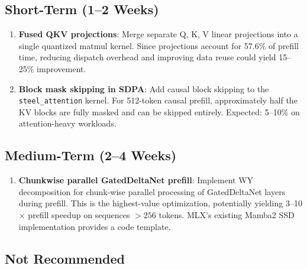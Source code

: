 \documentclass[11pt,a4paper]{article}
\begin{document}
\subsection{Short-Term (1--2 Weeks)}

\begin{enumerate}[leftmargin=2em]
  \item \textbf{Fused QKV projections}: Merge separate Q, K, V linear projections into a single quantized matmul kernel. Since projections account for 57.6\% of prefill time, reducing dispatch overhead and improving data reuse could yield 15--25\% improvement.

  \item \textbf{Block mask skipping in SDPA}: Add causal block skipping to the \texttt{steel\_attention} kernel. For 512-token causal prefill, approximately half the KV blocks are fully masked and can be skipped entirely. Expected: 5--10\% on attention-heavy workloads.
\end{enumerate}

\subsection{Medium-Term (2--4 Weeks)}

\begin{enumerate}[leftmargin=2em]
  \item \textbf{Chunkwise parallel GatedDeltaNet prefill}: Implement WY decomposition for chunk-wise parallel processing of GatedDeltaNet layers during prefill. This is the highest-value optimization, potentially yielding 3--10$\times$ prefill speedup on sequences $>256$ tokens. MLX's existing Mamba2 SSD implementation provides a code template.
\end{enumerate}

\subsection{Not Recommended}
\end{document}
